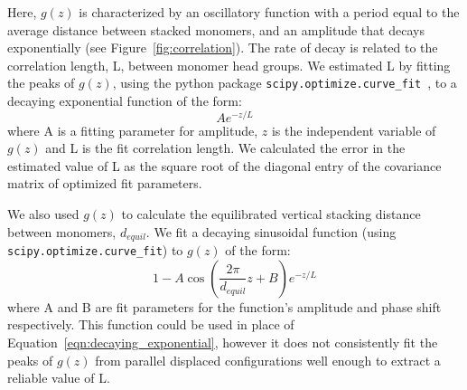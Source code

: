 \documentclass[journal=jpcbfk,manuscript=article]{achemso}
\begin{document}
  Here, $g(z)$ is characterized by an oscillatory function with a period equal to the
  average distance between stacked monomers, and an amplitude that decays exponentially
  (see Figure~\ref{fig:correlation}). The rate of decay is related to the correlation 
  length, L, between monomer head groups. We estimated L by fitting the peaks of $g(z)$,
  using the python package \texttt{scipy.optimize.curve\_fit}~\cite{oliphant_python_2007},
  to a decaying exponential function of the form:
  \begin{equation}
  	Ae^{-z/L}
  	\label{eqn:decaying_exponential}
  \end{equation}
  where A is a fitting parameter for amplitude, $z$ is the independent variable of $g(z)$ 
  and L is the fit correlation length. We calculated the error in the estimated value
  of L as the square root of the diagonal entry of the covariance matrix of 
  optimized fit parameters.
  
  We also used $g(z)$ to calculate the equilibrated vertical stacking distance between
  monomers, $d_{equil}$. 
  We fit a decaying sinusoidal function (using \texttt{scipy.optimize.curve\_fit}) to 
  $g(z)$ of the form:
  \begin{equation}
  	1 - A\cos\left(\frac{2\pi}{\mathit{d}_{equil}}z + B\right)e^{-z/L}
  	\label{eqn:decaying_sinusoid}
  \end{equation}
  where A and B are fit parameters for the function's amplitude and phase shift respectively.
  This function could be used in place of Equation~\ref{eqn:decaying_exponential}, however
  it does not consistently fit the peaks of $g(z)$ from parallel displaced configurations 
  well enough to extract a reliable value of L.


\end{document}
